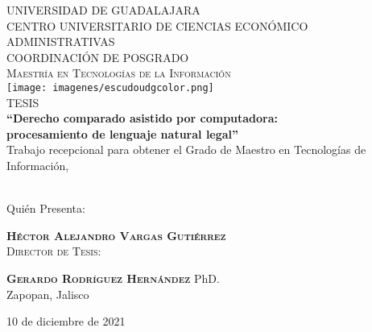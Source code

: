 \documentclass[12pt]{article}
\begin{document}
	\begin{titlepage}
		
		\newcommand{\HRule}{\rule{\linewidth}{0.5mm}}
		
		\center
		
		\textsc{ UNIVERSIDAD DE GUADALAJARA }\\%
		\textsc{ CENTRO UNIVERSITARIO DE CIENCIAS ECONÓMICO ADMINISTRATIVAS}\\[0.5cm]		
		\textsc{ COORDINACIÓN DE POSGRADO}\\%
		\textsc{ Maestría en Tecnologías de la Información }\\[0.5cm] %
		
		\texttt{[image: imagenes/escudoudgcolor.png]}\\[0.5cm]
		
		\textsc{ TESIS }\\[0.5cm] %
		
		
		{\bfseries ``Derecho comparado asistido por computadora: \\
		procesamiento de lenguaje natural legal''}\\[0.5cm]
		
		
		Trabajo recepcional para obtener el Grado de Maestro en Tecnologías de Información,\\\
		
		Quién Presenta:
		
		\textsc{\bfseries Héctor Alejandro Vargas Gutiérrez} \\
		
		
		\textsc{ Director de Tesis: }							
		
		 \textsc{\bfseries Gerardo Rodríguez Hernández} PhD.\\[0.4cm]
		 
		 Zapopan, Jalisco
		
		{\large 10 de diciembre de 2021} %
		
		\vfill %
	\end{titlepage}
	\newpage
	
\end{document}
